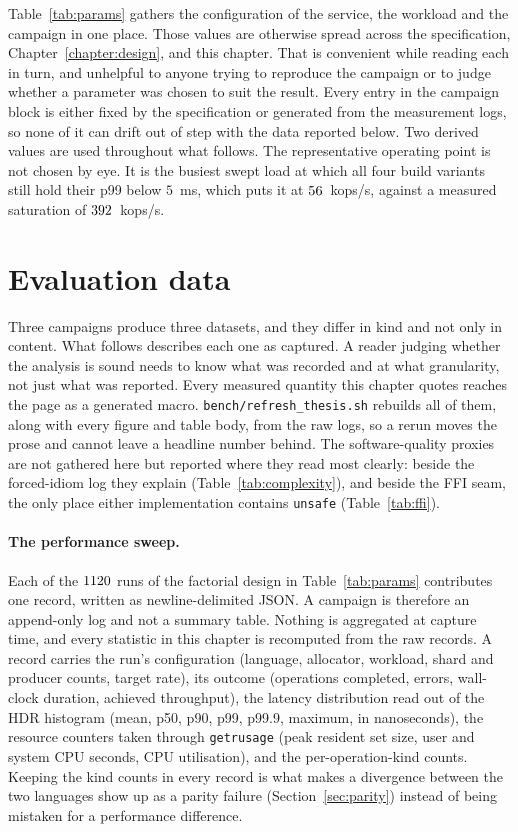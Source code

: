 \documentclass[english,oneside,a4paper,censored,csm,software-track-2020]{HYthesisML}
\begin{document}
Table~\ref{tab:params} gathers the configuration of the service, the workload and the campaign in
one place. Those values are otherwise spread across the specification,
Chapter~\ref{chapter:design}, and this chapter. That is convenient while reading each in turn, and
unhelpful to anyone trying to reproduce the campaign or to judge whether a parameter was chosen to
suit the result. Every entry in the campaign block is either fixed by the specification or
generated from the measurement logs, so none of it can drift out of step with the data reported
below. Two derived values are used throughout what follows. The representative operating point is
not chosen by eye. It is the busiest swept load at which all four build variants still hold
their p99 below $5$~ms, which puts it at $56$~kops/s, against a measured saturation of
$392$~kops/s.

\section{Evaluation data}
Three campaigns produce three datasets, and they differ in kind and not only in content. What
follows describes each one as captured. A reader judging whether the analysis is sound needs
to know what was recorded and at what granularity, not just what was reported. Every measured
quantity this chapter quotes reaches the page as a generated macro.
\texttt{bench/refresh\_thesis.sh} rebuilds all of them, along with every figure and table body,
from the raw logs, so a rerun moves the prose and cannot leave a headline number behind. The
software-quality
proxies are not gathered here but reported where they read most clearly: beside the
forced-idiom log they explain (Table~\ref{tab:complexity}), and beside the FFI seam, the only
place either implementation contains \texttt{unsafe} (Table~\ref{tab:ffi}).

\paragraph{The performance sweep.}
Each of the $1120$ runs of the factorial design in Table~\ref{tab:params} contributes one
record, written as newline-delimited JSON. A campaign is therefore an append-only log and not a
summary table. Nothing is aggregated at capture time, and every statistic in this chapter is
recomputed from the raw records. A record carries the run's configuration (language, allocator,
workload, shard and producer counts, target rate), its outcome (operations completed, errors,
wall-clock duration, achieved throughput), the latency distribution read out of the HDR
histogram (mean, p50, p90, p99, p99.9, maximum, in nanoseconds), the resource counters taken
through \texttt{getrusage} (peak resident set size, user and system CPU seconds, CPU
utilisation), and the per-operation-kind counts. Keeping the kind counts in every record is
what makes a divergence between the two languages show up as a parity failure
(Section~\ref{sec:parity}) instead of being mistaken for a performance difference.
\end{document}
